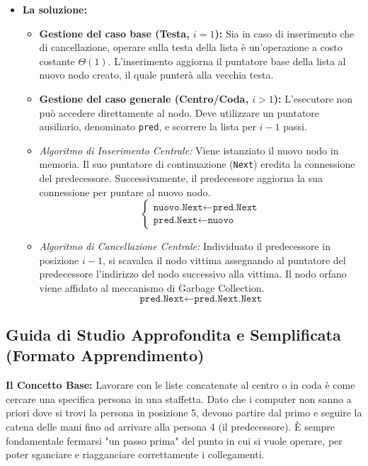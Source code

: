\documentclass[a4paper, 11pt]{report}
\begin{document}
\begin{itemize}
    \item \textbf{La soluzione:}
    \begin{itemize}
        \item \textbf{Gestione del caso base (Testa, $i=1$):} Sia in caso di inserimento che di cancellazione, operare sulla testa della lista è un'operazione a costo costante $\Theta(1)$. L'inserimento aggiorna il puntatore base della lista al nuovo nodo creato, il quale punterà alla vecchia testa.
        \item \textbf{Gestione del caso generale (Centro/Coda, $i > 1$):} L'esecutore non può accedere direttamente al nodo. Deve utilizzare un puntatore ausiliario, denominato \texttt{pred}, e scorrere la lista per $i-1$ passi.
        \item \textit{Algoritmo di Inserimento Centrale:} Viene istanziato il nuovo nodo in memoria. Il suo puntatore di continuazione (\texttt{Next}) eredita la connessione del predecessore. Successivamente, il predecessore aggiorna la sua connessione per puntare al nuovo nodo.
        \begin{equation*}
        \begin{cases}
        \texttt{nuovo.Next} \gets \texttt{pred.Next} \\
        \texttt{pred.Next} \gets \texttt{nuovo}
        \end{cases}
        \end{equation*}
        \item \textit{Algoritmo di Cancellazione Centrale:} Individuato il predecessore in posizione $i-1$, si scavalca il nodo vittima assegnando al puntatore del predecessore l'indirizzo del nodo successivo alla vittima. Il nodo orfano viene affidato al meccanismo di Garbage Collection.
        \begin{equation*}
        \texttt{pred.Next} \gets \texttt{pred.Next.Next}
        \end{equation*}
    \end{itemize}
\end{itemize}

\vspace{0.5cm}
\subsection*{Guida di Studio Approfondita e Semplificata (Formato Apprendimento)}



\textbf{Il Concetto Base:}
Lavorare con le liste concatenate al centro o in coda è come cercare una specifica persona in una staffetta. Dato che i computer non sanno a priori dove si trovi la persona in posizione 5, devono partire dal primo e seguire la catena delle mani fino ad arrivare alla persona 4 (il predecessore). È sempre fondamentale fermarsi "un passo prima" del punto in cui si vuole operare, per poter sganciare e riagganciare correttamente i collegamenti.
\end{document}
